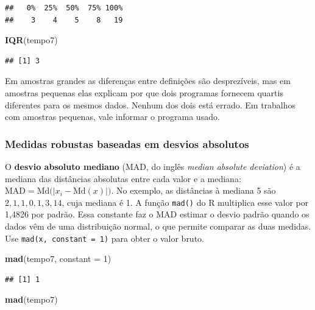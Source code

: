 \documentclass[
]{book}
\newenvironment{Shaded}{\begin{snugshade}}{\end{snugshade}}
\newcommand{\AttributeTok}[1]{\textcolor[rgb]{0.13,0.29,0.53}{#1}}
\newcommand{\DecValTok}[1]{\textcolor[rgb]{0.00,0.00,0.81}{#1}}
\newcommand{\FunctionTok}[1]{\textcolor[rgb]{0.13,0.29,0.53}{\textbf{#1}}}
\newcommand{\NormalTok}[1]{#1}
\begin{document}
\begin{verbatim}
##   0%  25%  50%  75% 100% 
##    3    4    5    8   19
\end{verbatim}

\begin{Shaded}
\begin{Highlighting}[]
\FunctionTok{IQR}\NormalTok{(tempo7)}
\end{Highlighting}
\end{Shaded}

\begin{verbatim}
## [1] 3
\end{verbatim}

Em amostras grandes as diferenças entre definições são desprezíveis, mas em amostras pequenas elas explicam por que dois programas fornecem quartis diferentes para os mesmos dados. Nenhum dos dois está errado. Em trabalhos com amostras pequenas, vale informar o programa usado.

\subsubsection{Medidas robustas baseadas em desvios absolutos}\label{medidas-robustas-baseadas-em-desvios-absolutos}

O \textbf{desvio absoluto mediano} (MAD, do inglês \emph{median absolute deviation}) é a mediana das distâncias absolutas entre cada valor e a mediana: \(\text{MAD} = \text{Md}\big(|x_i - \text{Md}(x)|\big)\). No exemplo, as distâncias à mediana 5 são \(2, 1, 1, 0, 1, 3, 14\), cuja mediana é 1. A função \texttt{mad()} do R multiplica esse valor por 1,4826 por padrão. Essa constante faz o MAD estimar o desvio padrão quando os dados vêm de uma distribuição normal, o que permite comparar as duas medidas. Use \texttt{mad(x,\ constant\ =\ 1)} para obter o valor bruto.

\begin{Shaded}
\begin{Highlighting}[]
\FunctionTok{mad}\NormalTok{(tempo7, }\AttributeTok{constant =} \DecValTok{1}\NormalTok{)}
\end{Highlighting}
\end{Shaded}

\begin{verbatim}
## [1] 1
\end{verbatim}

\begin{Shaded}
\begin{Highlighting}[]
\FunctionTok{mad}\NormalTok{(tempo7)}
\end{Highlighting}
\end{Shaded}
\end{document}
